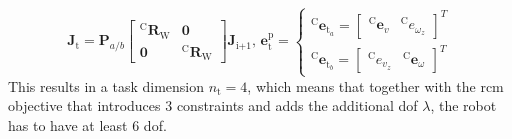 \begin{equation}
    \mathbf{J}_\text{t} = \mathbf{P}_{a/b} \begin{bmatrix}^\text{C}\mathbf{R}_\text{W} & \mathbf{0} \\ \mathbf{0} & ^\text{C}\mathbf{R}_\text{W}\end{bmatrix}\mathbf{J}_\text{i+1},\,
    \mathbf{e}^\text{p}_\text{t} = 
    \begin{cases}
        ^\text{C}\mathbf{e}_{\text{t}_a}=\begin{bmatrix}^\text{C}\mathbf{e}_v & ^\text{C}e_{\omega_z} \end{bmatrix}^T \\
        ^\text{C}\mathbf{e}_{\text{t}_b}=\begin{bmatrix}^\text{C}e_{v_z} & ^\text{C}\mathbf{e}_{\omega} \end{bmatrix}^T
    \end{cases}
\end{equation}
This results in a task dimension $n_\text{t} = 4$, which means that together with the \acrshort{rcm} objective that introduces 3 constraints and adds the additional \acrshort{dof} $\lambda$, the robot has to have at least 6 \acrshort{dof}.

